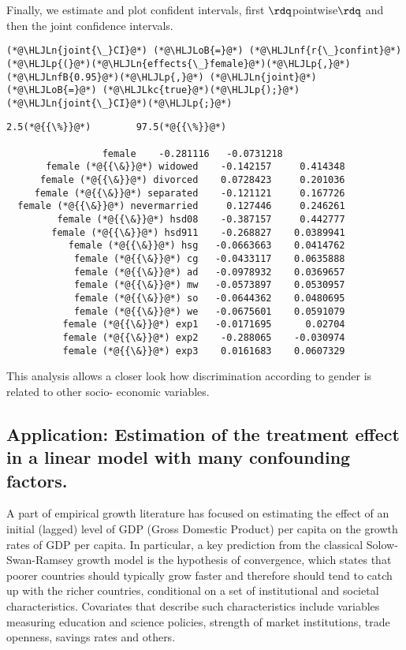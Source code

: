 \documentclass[12pt,a4paper]{article}
\newcommand{\HLJLkc}[1]{\textcolor[RGB]{59,151,46}{\textit{#1}}}
\newcommand{\HLJLn}[1]{#1}
\newcommand{\HLJLnf}[1]{\textcolor[RGB]{66,102,213}{#1}}
\newcommand{\HLJLnfB}[1]{\textcolor[RGB]{59,151,46}{#1}}
\newcommand{\HLJLoB}[1]{\textcolor[RGB]{102,102,102}{\textbf{#1}}}
\newcommand{\HLJLp}[1]{#1}
\begin{document}
Finally, we estimate and plot confident intervals, first \ensuremath{\rdq}pointwise\ensuremath{\rdq} and then the joint confidence intervals.


\begin{lstlisting}
(*@\HLJLn{joint{\_}CI}@*) (*@\HLJLoB{=}@*) (*@\HLJLnf{r{\_}confint}@*)(*@\HLJLp{(}@*)(*@\HLJLn{effects{\_}female}@*)(*@\HLJLp{,}@*) (*@\HLJLnfB{0.95}@*)(*@\HLJLp{,}@*) (*@\HLJLn{joint}@*) (*@\HLJLoB{=}@*) (*@\HLJLkc{true}@*)(*@\HLJLp{);}@*)
(*@\HLJLn{joint{\_}CI}@*)(*@\HLJLp{;}@*)
\end{lstlisting}

\begin{lstlisting}
2.5(*@{{\%}}@*)        97.5(*@{{\%}}@*)

                 female    -0.281116   -0.0731218
       female (*@{{\&}}@*) widowed    -0.142157     0.414348
      female (*@{{\&}}@*) divorced    0.0728423     0.201036
     female (*@{{\&}}@*) separated    -0.121121     0.167726
  female (*@{{\&}}@*) nevermarried     0.127446     0.246261
         female (*@{{\&}}@*) hsd08    -0.387157     0.442777
        female (*@{{\&}}@*) hsd911    -0.268827    0.0389941
           female (*@{{\&}}@*) hsg   -0.0663663    0.0414762
            female (*@{{\&}}@*) cg   -0.0433117    0.0635888
            female (*@{{\&}}@*) ad   -0.0978932    0.0369657
            female (*@{{\&}}@*) mw   -0.0573897    0.0530957
            female (*@{{\&}}@*) so   -0.0644362    0.0480695
            female (*@{{\&}}@*) we   -0.0675601    0.0591079
          female (*@{{\&}}@*) exp1   -0.0171695      0.02704
          female (*@{{\&}}@*) exp2    -0.288065    -0.030974
          female (*@{{\&}}@*) exp3    0.0161683    0.0607329
\end{lstlisting}


This analysis allows a closer look how discrimination according to gender is related to other socio- economic variables.

\subsection{Application: Estimation of the treatment effect in a linear model with many confounding factors.}
A part of empirical growth literature has focused on estimating the effect of an initial (lagged) level of GDP (Gross Domestic Product) per capita on the growth rates of GDP per capita. In particular, a key prediction from the classical Solow-Swan-Ramsey growth model is the hypothesis of convergence, which states that poorer countries should typically grow faster and therefore should tend to catch up with the richer countries, conditional on a set of institutional and societal characteristics. Covariates that describe such characteristics include variables measuring education and science policies, strength of market institutions, trade openness, savings rates and others.
\end{document}
